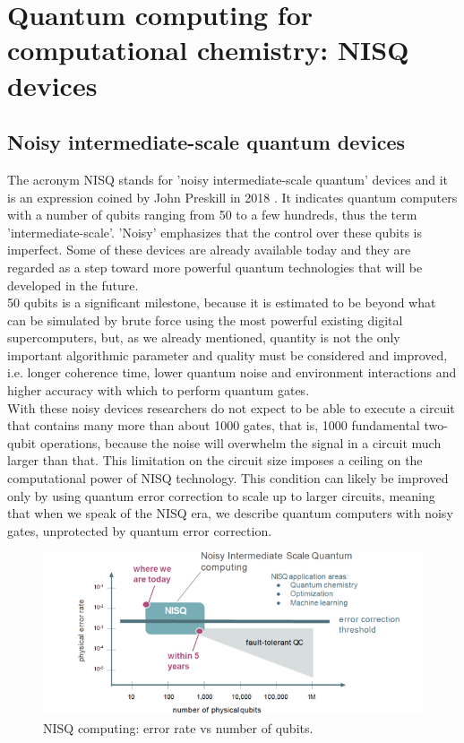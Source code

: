 \chapter{Quantum computing for computational chemistry: NISQ devices} \label{Quantum computing for computational chemistry: NISQ devices}

\section{Noisy intermediate-scale quantum devices}
The acronym NISQ stands for 'noisy intermediate-scale quantum' devices and it is an expression coined by John Preskill in 2018 \cite{Preskill2018Aug}. It indicates quantum computers with a number of qubits ranging from 50 to a few hundreds, thus the term 'intermediate-scale'. 'Noisy' emphasizes that the control over these qubits is imperfect. Some of these devices are already available today and they are regarded as a step toward more powerful quantum technologies that will be developed in the future. \\
50 qubits is a significant milestone, because it is estimated to be beyond what can be simulated by brute force using the most powerful existing digital supercomputers, but, as we already mentioned, quantity is not the only important algorithmic parameter and quality must be considered and improved, i.e. longer coherence time, lower quantum noise and environment interactions and higher accuracy with which to perform quantum gates. \\
With these noisy devices researchers do not expect to be able to execute a circuit that contains many more than about 1000 gates, that is, 1000 fundamental two-qubit operations, because the noise will overwhelm the signal in a circuit much larger than that. This limitation on the circuit size imposes a ceiling on the computational power of NISQ technology. This condition can likely be improved only by using quantum error correction to scale up to larger circuits, meaning that when we speak of the NISQ era, we describe quantum computers with noisy gates, unprotected by quantum error correction. \\
\begin{figure}[ht]
  \centering
  \includegraphics[width=\textwidth]{figures/NISQ.png}
  \caption{NISQ computing: error rate vs number of qubits.} \label{NISQ}
\end{figure} \\
